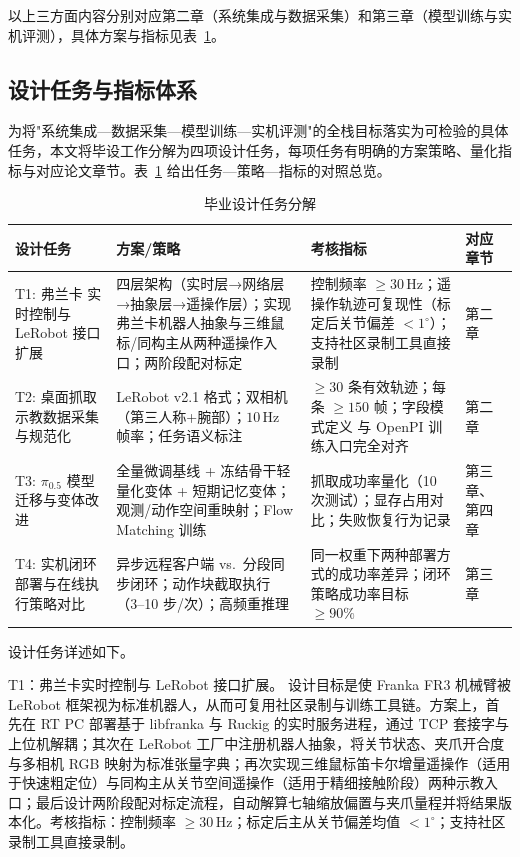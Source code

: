 以上三方面内容分别对应第二章（系统集成与数据采集）和第三章（模型训练与实机评测），具体方案与指标见表~\ref{tab:design-tasks}。

\subsection{设计任务与指标体系}

为将"系统集成—数据采集—模型训练—实机评测"的全栈目标落实为可检验的具体任务，本文将毕设工作分解为四项设计任务，每项任务有明确的方案策略、量化指标与对应论文章节。表~\ref{tab:design-tasks} 给出任务—策略—指标的对照总览。

\begin{table}[htbp]
  \centering
  \small
  \caption{毕业设计任务分解}
  \label{tab:design-tasks}
  \begin{tabular}{>{\raggedright\arraybackslash}p{2.6cm}>{\raggedright\arraybackslash}p{4.0cm}>{\raggedright\arraybackslash}p{4.5cm}>{\raggedright\arraybackslash}p{2.5cm}}
    \toprule
    设计任务 & 方案/策略 & 考核指标 & 对应章节 \\
    \midrule
    T1: 弗兰卡 实时控制与 LeRobot 接口扩展 & 四层架构（实时层→网络层→抽象层→遥操作层）；实现弗兰卡机器人抽象与三维鼠标/同构主从两种遥操作入口；两阶段配对标定 & 控制频率 $\geqslant 30\,\mathrm{Hz}$；遥操作轨迹可复现性（标定后关节偏差 $<1^\circ$）；支持社区录制工具直接录制 & 第二章 \\
    \midrule
    T2: 桌面抓取示教数据采集与规范化 & LeRobot v2.1 格式；双相机（第三人称+腕部）；$10\,\mathrm{Hz}$ 帧率；任务语义标注 & $\geqslant 30$ 条有效轨迹；每条 $\geqslant 150$ 帧；字段模式定义 与 OpenPI 训练入口完全对齐 & 第二章 \\
    \midrule
    T3: $\pi_{0.5}$ 模型迁移与变体改进 & 全量微调基线 + 冻结骨干轻量化变体 + 短期记忆变体；观测/动作空间重映射；Flow Matching 训练 & 抓取成功率量化（10 次测试）；显存占用对比；失败恢复行为记录 & 第三章、第四章 \\
    \midrule
    T4: 实机闭环部署与在线执行策略对比 & 异步远程客户端 vs.\ 分段同步闭环；动作块截取执行（3--10 步/次）；高频重推理 & 同一权重下两种部署方式的成功率差异；闭环策略成功率目标 $\geqslant 90\%$ & 第三章 \\
    \bottomrule
  \end{tabular}
\end{table}

\noindent 设计任务详述如下。

T1：弗兰卡实时控制与 LeRobot 接口扩展。
设计目标是使 Franka FR3 机械臂被 LeRobot 框架视为标准机器人，从而可复用社区录制与训练工具链。方案上，首先在 RT PC 部署基于 libfranka 与 Ruckig 的实时服务进程，通过 TCP 套接字与上位机解耦；其次在 LeRobot 工厂中注册机器人抽象，将关节状态、夹爪开合度与多相机 RGB 映射为标准张量字典；再次实现三维鼠标笛卡尔增量遥操作（适用于快速粗定位）与同构主从关节空间遥操作（适用于精细接触阶段）两种示教入口；最后设计两阶段配对标定流程，自动解算七轴缩放偏置与夹爪量程并将结果版本化。考核指标：控制频率 $\geqslant 30\,\mathrm{Hz}$；标定后主从关节偏差均值 $<1^\circ$；支持社区录制工具直接录制。

